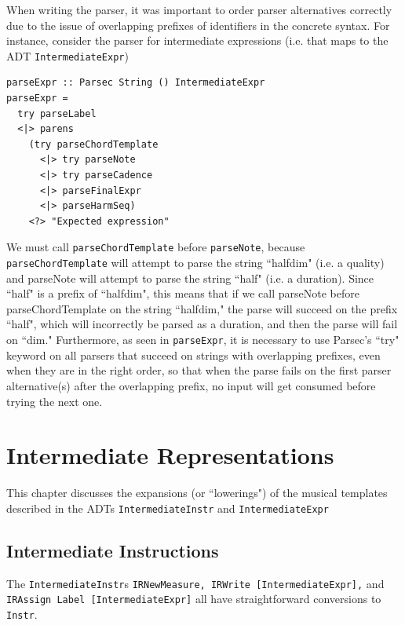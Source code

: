 \documentclass{report}
\begin{document}
When writing the parser, it was important to order parser alternatives correctly due to the issue of overlapping prefixes of identifiers in the concrete syntax. For instance, consider the parser for intermediate expressions (i.e. that maps to the ADT \verb.IntermediateExpr.)

\begin{verbatim}
parseExpr :: Parsec String () IntermediateExpr
parseExpr = 
  try parseLabel
  <|> parens 
    (try parseChordTemplate 
      <|> try parseNote
      <|> try parseCadence
      <|> parseFinalExpr
      <|> parseHarmSeq)
    <?> "Expected expression"
\end{verbatim}

We must call \verb.parseChordTemplate. before \verb.parseNote., because \verb.parseChordTemplate. will attempt to parse the string ``halfdim" (i.e. a quality) and parseNote will attempt to parse the string ``half" (i.e. a duration). Since ``half" is a prefix of ``halfdim", this means that if we call parseNote before parseChordTemplate on the string ``halfdim," the parse will succeed on the prefix ``half", which will incorrectly be parsed as a duration, and then the parse will fail on ``dim." Furthermore, as seen in \verb.parseExpr., it is necessary to use Parsec's ``try" keyword on all parsers that succeed on strings with overlapping prefixes, even when they are in the right order, so that when the parse fails on the first parser alternative(s) after the overlapping prefix, no input will get consumed before trying the next one.

\chapter{Intermediate Representations}
\label{chap:ir}
This chapter discusses the expansions (or ``lowerings") of the musical templates described in the ADTs \verb.IntermediateInstr. and \verb.IntermediateExpr. 

\section{Intermediate Instructions}
The \verb.IntermediateInstr.s \verb.IRNewMeasure, IRWrite [IntermediateExpr],. and \\\verb.IRAssign Label [IntermediateExpr]. all have straightforward conversions to \verb.Instr.. 
\end{document}
